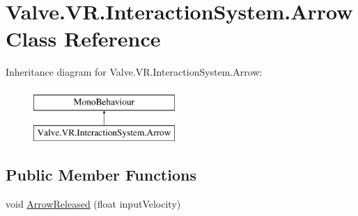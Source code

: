 \hypertarget{class_valve_1_1_v_r_1_1_interaction_system_1_1_arrow}{}\section{Valve.\+V\+R.\+Interaction\+System.\+Arrow Class Reference}
\label{class_valve_1_1_v_r_1_1_interaction_system_1_1_arrow}
Inheritance diagram for Valve.\+V\+R.\+Interaction\+System.\+Arrow\+:\begin{figure}[H]
\begin{center}
\leavevmode
\includegraphics[height=2.000000cm]{class_valve_1_1_v_r_1_1_interaction_system_1_1_arrow}
\end{center}
\end{figure}
\subsection*{Public Member Functions}
\begin{DoxyCompactItemize}
\item 
void \mbox{\hyperlink{class_valve_1_1_v_r_1_1_interaction_system_1_1_arrow_a936f74ee01dcd577819cbdd19c9b5825}{Arrow\+Released}} (float input\+Velocity)
\end{DoxyCompactItemize}
